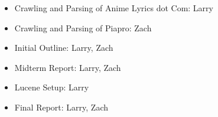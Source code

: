 \documentclass{acm} %
\begin{document}
\begin{CJK}{UTF8}{zhsong}
\begin{itemize}
\item Crawling and Parsing of Anime Lyrics dot Com: Larry
\item Crawling and Parsing of Piapro: Zach
\item Initial Outline: Larry, Zach
\item Midterm Report: Larry, Zach
\item Lucene Setup: Larry
\item Final Report: Larry, Zach
\end{itemize}



\end{CJK}
\end{document}
